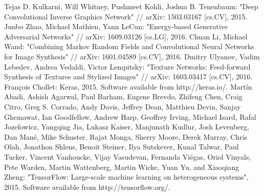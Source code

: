 \documentclass[a4paper]{article}
\begin{document}
\begin{thebibliography}{99}
		 Tejas D. Kulkarni, Will Whitney, Pushmeet Kohli, Joshua B. Tenenbaum: "Deep Convolutional Inverse Graphics Network" // arXiv: 1503.03167 [cs.CV], 2015.
		 Junbo Zhao, Michael Mathien, Yann LeCun: "Energy-based Generative Adversarial Networks" // arXiv: 1609.03126 [cs.LG], 2016.
		 Chuan Li, Michael Wand: "Combining Markov Random Fields and Convolutional Neural Networks for Image Synthesis" // arXiv: 1601.04589 [cs.CV], 2016.
		 Dmitry Ulyanov, Vadim Lebedev, Andrea Vedaldi, Victor Lempitsky: "Texture Networks: Feed-forward Synthesis of Textures and Stylized Images" // arXiv: 1603.03417 [cs.CV], 2016.
		 François Chollet: Keras, 2015. Software available from http://keras.io/.
		 Martín Abadi, Ashish Agarwal, Paul Barham, Eugene Brevdo, Zhifeng Chen, Craig Citro, Greg S. Corrado, Andy Davis, Jeffrey Dean, Matthieu Devin, Sanjay Ghemawat, Ian Goodfellow, Andrew Harp, Geoffrey Irving, Michael Isard, Rafal Jozefowicz, Yangqing Jia, Lukasz Kaiser, Manjunath Kudlur, Josh Levenberg, Dan Mané, Mike Schuster, Rajat Monga, Sherry Moore, Derek Murray, Chris Olah, Jonathon Shlens, Benoit Steiner, Ilya Sutskever, Kunal Talwar, Paul Tucker, Vincent Vanhoucke, Vijay Vasudevan, Fernanda Viégas, Oriol Vinyals, Pete Warden, Martin Wattenberg, Martin Wicke, Yuan Yu, and Xiaoqiang Zheng: "TensorFlow: Large-scale machine learning on heterogeneous systems", 2015. Software available from http://tensorflow.org/.
	\end{thebibliography}
	
\end{document}
